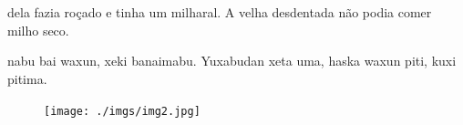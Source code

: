 \chapter*{}

\mbox{}\vspace*{\fill}




 dela fazia roçado e tinha
um milharal. A velha desdentada
não podia comer milho seco.

\vspace{2em}

 nabu bai waxun, xeki
banaimabu. Yuxabudan xeta uma,
haska waxun piti, kuxi pitima.

\vspace*{\fill}

\pagebreak
\thispagestyle{empty}
\begin{figure}
\vspace*{-2cm}
\hspace*{-2.2cm}\texttt{[image: ./imgs/img2.jpg]}
\end{figure}

\chapter*{}

\vspace*{-\baselineskip}


